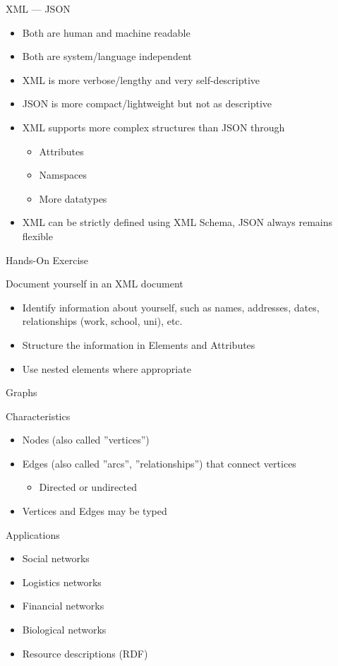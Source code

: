 \documentclass[ignorenonframetext,xcolor=x11names]{beamer}
\begin{document}
\begin{frame}[fragile]{XML --- JSON}
\begin{itemize}
   \item Both are human and machine readable
   \item Both are system/language independent
   \item XML is more verbose/lengthy and very self-descriptive
   \item JSON is more compact/lightweight but not as descriptive
   \item XML supports more complex structures than JSON through
   \begin{itemize} 
      \item Attributes
      \item Namspaces
      \item More datatypes
   \end{itemize}
   \item XML can be strictly defined using XML Schema, JSON always remains flexible
\end{itemize}
\end{frame}

\begin{frame}{Hands-On Exercise}
\begin{block}{Document yourself in an XML document}
\begin{itemize}
	\item Identify information about yourself, such as names, addresses, dates, relationships (work, school, uni), etc.
	\item Structure the information in Elements and Attributes 
	\item Use nested elements where appropriate
\end{itemize}
\end{block}
\end{frame}

\begin{frame}{Graphs}
\begin{block}{Characteristics}
\begin{itemize}
	\item Nodes (also called ''vertices'')
	\item Edges (also called ''arcs'', ''relationships'') that connect vertices
	\begin{itemize}
		\item Directed or undirected
	\end{itemize}
	\item Vertices and Edges may be typed
\end{itemize}
\end{block}
\begin{block}{Applications}
\begin{itemize}
	\item Social networks
	\item Logistics networks
	\item Financial networks
	\item Biological networks
	\item Resource descriptions (RDF)
\end{itemize}
\end{block}
\end{frame}
\end{document}
